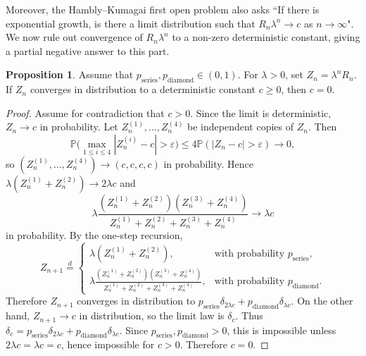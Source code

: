 \documentclass{article}
\theoremstyle{plain}
\theoremstyle{definition}
\newtheorem{proposition}[theorem]{Proposition}
\begin{document}
Moreover, the Hambly--Kumagai first open problem also asks ``If there is exponential growth, is there a limit distribution such that $R_n \lambda^n \to c$ as $n \to \infty$".
We now rule out convergence of $R_n \lambda^n$ to a non-zero deterministic constant, giving a partial negative answer to this part.

\begin{proposition}\label{prop:no_deterministic_limit}
Assume that \(p_{\mathrm{series}},p_{\mathrm{diamond}}\in(0,1)\).
For \(\lambda>0\), set \(Z_n=\lambda^n R_n\).
If \(Z_n\) converges in distribution to a deterministic constant \(c\ge 0\), then \(c=0\).
\end{proposition}

\begin{proof}
Assume for contradiction that \(c>0\).
Since the limit is deterministic, \(Z_n\to c\) in probability.
Let \(Z_n^{(1)},\dots,Z_n^{(4)}\) be independent copies of \(Z_n\).
Then
\[
\mathbb P\Big(\max_{1\le i\le 4}|Z_n^{(i)}-c|>\varepsilon\Big)\le 4\mathbb P(|Z_n-c|>\varepsilon)\to 0,
\]
so \((Z_n^{(1)},\dots,Z_n^{(4)})\to (c,c,c,c)\) in probability.
Hence
$
\lambda(Z_n^{(1)}+Z_n^{(2)})\to 2\lambda c
$
and
\[
\lambda\frac{(Z_n^{(1)}+Z_n^{(2)})(Z_n^{(3)}+Z_n^{(4)})}{Z_n^{(1)}+Z_n^{(2)}+Z_n^{(3)}+Z_n^{(4)}}\to \lambda c
\]
in probability.
By the one-step recursion,
\[
Z_{n+1}\stackrel d=
\begin{cases}
\lambda(Z_n^{(1)}+Z_n^{(2)}), & \text{with probability } p_{\mathrm{series}},\\
\lambda\frac{(Z_n^{(1)}+Z_n^{(2)})(Z_n^{(3)}+Z_n^{(4)})}{Z_n^{(1)}+Z_n^{(2)}+Z_n^{(3)}+Z_n^{(4)}}, & \text{with probability } p_{\mathrm{diamond}}.
\end{cases}
\]
Therefore \(Z_{n+1}\) converges in distribution to
$
p_{\mathrm{series}}\delta_{2\lambda c}+p_{\mathrm{diamond}}\delta_{\lambda c}.
$
On the other hand, \(Z_{n+1}\to c\) in distribution, so the limit law is \(\delta_c\).
Thus
$
\delta_c=p_{\mathrm{series}}\delta_{2\lambda c}+p_{\mathrm{diamond}}\delta_{\lambda c}.
$
Since \(p_{\mathrm{series}},p_{\mathrm{diamond}}>0\), this is impossible unless \(2\lambda c=\lambda c=c\), hence impossible for \(c>0\).
Therefore \(c=0\).
\end{proof}
\end{document}

